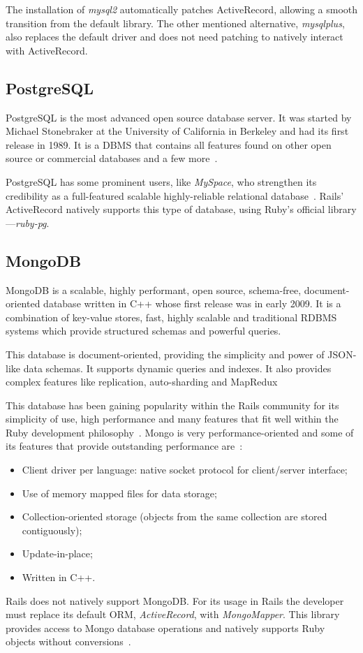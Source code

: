 The installation of \textit{mysql2} automatically patches ActiveRecord, allowing a smooth transition from the default library. The other mentioned alternative, \textit{mysqlplus}, also replaces the default driver and does not need patching to natively interact with ActiveRecord.


\subsection{PostgreSQL}
PostgreSQL is the most advanced open source database server. It was started by Michael Stonebraker at the University of California in Berkeley and had its first release in 1989. It is a DBMS that contains all features found on other open source or commercial databases and a few more~\cite{beginning_postgresql}.

PostgreSQL has some prominent users, like \textit{MySpace}, who strengthen its credibility as a full-featured scalable highly-reliable relational database~\cite{petabyte_warehouses}. Rails' ActiveRecord natively supports this type of database, using Ruby's official library---\textit{ruby-pg}.


\subsection{MongoDB}
MongoDB is a scalable, highly performant, open source, schema-free, document-oriented database written in C++ whose first release was in early 2009. It is a combination of key-value stores, fast, highly scalable and traditional RDBMS systems which provide structured schemas and powerful queries.

This database is document-oriented, providing the simplicity and power of JSON-like data schemas. It supports dynamic queries and indexes. It also provides complex features like replication, auto-sharding and MapRedux~\cite{mongodb}

This database has been gaining popularity within the Rails community for its simplicity of use, high performance and many features that fit well within the Ruby development philosophy~\cite{mongodb_rails}. Mongo is very performance-oriented and some of its features that provide outstanding performance are~\cite{mongodb_couchdb}:
\begin{itemize}
  \item Client driver per language: native socket protocol for client/server interface;
  \item Use of memory mapped files for data storage;
  \item Collection-oriented storage (objects from the same collection are stored contiguously);
  \item Update-in-place;
  \item Written in C++.
\end{itemize}
Rails does not natively support MongoDB. For its usage in Rails the developer must replace its default ORM, \textit{ActiveRecord}, with \textit{MongoMapper}. This library provides access to Mongo database operations and natively supports Ruby objects without conversions~\cite{mongomapper}.


